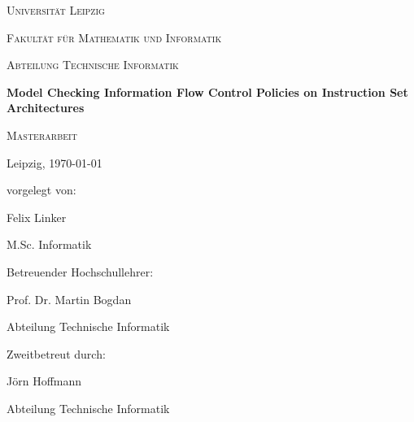 \documentclass[headings=standardclasses]{scrbook}
\theoremstyle{remark}
\begin{document}
\begin{titlepage}
    \centering
    \par
    \vspace{1cm}
    {\scshape\LARGE Universität Leipzig} \par
    \vspace{0.3cm}
    {\scshape\Large Fakultät für Mathematik und Informatik} \par
    {\scshape\Large Abteilung Technische Informatik} \par
    \vspace{2.3cm}
    {\huge\bfseries Model Checking Information Flow Control Policies on Instruction Set Architectures} \par
    \vspace{1.5cm}
    {\scshape\Large Masterarbeit} \par
    \vspace{1.8cm}
    \begin{multicols}{2}
        Leipzig, \today \par
        \columnbreak
        vorgelegt von: \par
        Felix Linker \par
        M.Sc. Informatik
    \end{multicols}
    \vfill
    \begin{multicols}{2}
        Betreuender Hochschullehrer: \par
        Prof. Dr. Martin Bogdan \par
        Abteilung Technische Informatik \par
        \columnbreak
        Zweitbetreut durch: \par
        Jörn Hoffmann \par
        Abteilung Technische Informatik
    \end{multicols}
\end{titlepage}

\pagestyle{empty}
\renewcommand{\chapterpagestyle}{empty}



\tableofcontents

\printnoidxglossary[type=acronym]

\thispagestyle{empty}
\pagestyle{plain}
\renewcommand{\chapterpagestyle}{plain}
\setcounter{page}{-1}
\end{document}
